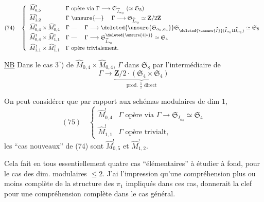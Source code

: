 \[
(74)\quad\left\{\begin{array}{ll}
\widehat M^!_{0,5}&\Gamma\text{ opère via }\Gamma\longrightarrow\mathfrak S_{\widehat I_{\alpha_0}}\ (\simeq\mathfrak S_5)\\
\widehat M^!_{1,2}&\Gamma\text{ \unsure{---} }\quad\Gamma\longrightarrow\mathfrak S_{\widehat I_{\alpha_0}}\simeq\mathbf Z/2\mathbf Z\\
\widehat M^!_{0,4}\times\widehat M^!_{0,4}&\Gamma\text{ --- }\quad\Gamma\longrightarrow\deleted{\unsure{\mathfrak S_{\alpha_0,\alpha_1}}}\mathfrak S_{\deleted{\unsure{\widehat I}}(\widehat I_{\alpha_0}\amalg\widehat I_{\alpha_1})}\simeq\mathfrak S_8\\
\widehat M^!_{0,4}\times\widehat M^!_{1,1}&\Gamma\text{ --- }\quad\Gamma\longrightarrow\mathfrak S^{\deleted{\unsure{4|*}}}_{\widehat I_{\alpha_0}}\simeq\mathfrak S_4\\
\widehat M^!_{1,1}\times\widehat M^!_{1,1}&\Gamma\text{ opère trivialement.}
\end{array}\right.
\]

\uline{NB}  Dans le cas $3^\circ$) de $\widehat M_{0,4}\times\widehat M_{0,4}$, $\Gamma$  dans $\mathfrak S_8$ par l'intermédiaire de
\[
\Gamma\longrightarrow\underbrace{\mathbf Z/2\mathbin{\cdot}(\mathfrak S_4\times\mathfrak S_4)}_{\text{prod. }\frac12\text{ direct}}
\]

On peut considérer que par rapport aux schémas modulaires  de dim $1$, 
\[
(75)\quad\left\{\begin{array}{ll}
\widehat M^!_{0,4}&\Gamma\text{ opère via }\Gamma\longrightarrow\mathfrak S_{I_{\alpha_0}}\simeq\mathfrak S_4\\
\widehat M^!_{1,1}&\Gamma\text{ opère trivialt},
\end{array}\right.
\]
les ``cas nouveaux'' de (74) sont $\widehat M^!_{0,5}$ et $\widehat M^!_{1,2}$.

Cela fait en tous essentiellement quatre cas ``élémentaires'' à étudier à fond, pour le cas des dim. modulaires $\leq2$. J'ai l'impression qu'une compréhension plus ou moins complète de la structure des $\pi_1$  impliqués dans ces cas, donnerait la clef pour une compréhension complète dans le cas général.
